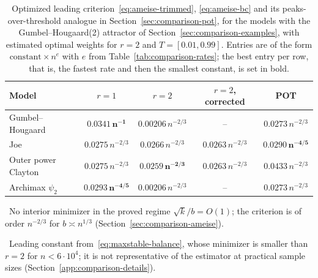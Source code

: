\begin{table}[t]
\centering
\small
\caption{Optimized leading criterion~\eqref{eq:ameise-trimmed},
\eqref{eq:ameise-bc} and its peaks-over-threshold analogue in
Section~\ref{sec:comparison-pot}, for the models with the
Gumbel--Hougaard(2) attractor of Section~\ref{sec:comparison-examples}, with
estimated optimal weights for $r=2$ and $T=[0.01,0.99]$. Entries are of the form
$\text{constant}\times n^{e}$ with $e$ from Table~\ref{tab:comparison-rates};
the best entry per row, that is, the fastest rate and then the smallest
constant, is set in bold.}
\label{tab:comparison-ameise}
\begin{tabular}{lcccc}
\toprule
Model & $r=1$ & $r=2$ & $r=2$, corrected & POT\\
\midrule
Gumbel--Hougaard
 & $\bm{0.0341\,n^{-1}}$
 & $0.00206\,n^{-2/3}$\rlap{\,\textsuperscript{\ddag}}
 & --\rlap{\,\textsuperscript{\dag}}
 & $0.0273\,n^{-2/3}$\\
Joe
 & $0.0275\,n^{-2/3}$
 & $0.0266\,n^{-2/3}$
 & $0.0263\,n^{-2/3}$
 & $\bm{0.0290\,n^{-4/5}}$\\
Outer power Clayton
 & $0.0275\,n^{-2/3}$
 & $\bm{0.0259\,n^{-2/3}}$
 & $0.0263\,n^{-2/3}$
 & $0.0433\,n^{-2/3}$\\
Archimax $\psi_2$
 & $\bm{0.0293\,n^{-4/5}}$
 & $0.00206\,n^{-2/3}$\rlap{\,\textsuperscript{\ddag}}
 & --\rlap{\,\textsuperscript{\dag}}
 & $0.0273\,n^{-2/3}$\\
\bottomrule
\end{tabular}

\smallskip
{\footnotesize
\dag~No interior minimizer in the proved regime
$\sqrt{k}/b=O(1)$; the criterion is of order $n^{-2/3}$ for
$b\asymp n^{1/3}$ (Section~\ref{sec:comparison-ameise}).\par
\ddag~Leading constant from~\eqref{eq:maxstable-balance}, whose
minimizer is smaller than $r=2$ for $n<6\cdot10^{4}$; it is not representative of
the estimator at practical sample sizes (Section~\ref{app:comparison-details}).}
\end{table}
